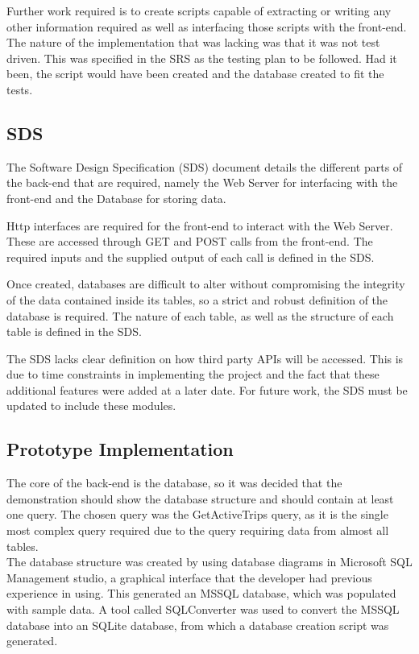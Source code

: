 \documentclass[12pt]{article}
\begin{document}
Further work required is to create scripts capable of extracting or writing any other information required as well as interfacing those scripts with the front-end.\\

The nature of the implementation that was lacking was that it was not test driven. This was specified in the SRS as the testing plan to be followed. Had it been, the script would have been created and the database created to fit the tests.
\subsection{SDS}
The Software Design Specification (SDS) document details the different parts of the back-end that are required, namely the Web Server for interfacing with the front-end and the Database for storing data.

Http interfaces are required for the front-end to interact with the Web Server. These are accessed through GET and POST calls from the front-end. The required inputs and the supplied output of each call is defined in the SDS.

Once created, databases are difficult to alter without compromising the integrity of the data contained inside its tables, so a strict and robust definition of the database is required. The nature of each table, as well as the structure of each table is defined in the SDS.

The SDS lacks clear definition on how third party APIs will be accessed. This is due to time constraints in implementing the project and the fact that these additional features were added at a later date. For future work, the SDS must be updated to include these modules.
\subsection{Prototype Implementation}
The core of the back-end is the database, so it was decided that the demonstration should show the database structure and should contain at least one query. The chosen query was the GetActiveTrips query, as it is the single most complex query required due to the query requiring data from almost all tables.\\

The database structure was created by using database diagrams in Microsoft SQL Management studio, a graphical interface that the developer had previous experience in using. This generated an MSSQL database, which was populated with sample data. A tool called SQLConverter was used to convert the MSSQL database into an SQLite database, from which a database creation script was generated.\\
\end{document}
